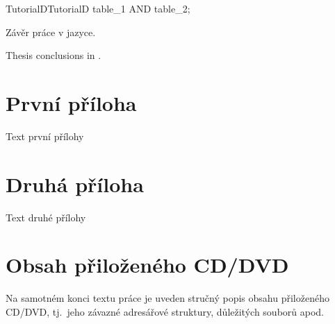\documentclass[
  field=inf,
  biblatex,
  glossaries,
  index
]{kidiplom}
\begin{document}
\begin{kicode}{TutorialD}{}{TutorialD}
table_1 AND table_2;
\end{kicode}

\begin{kiconclusions}
Závěr práce v  jazyce.
\end{kiconclusions}

\begin{kiconclusions}[english]
Thesis conclusions in .
\end{kiconclusions}

\appendix

\section{První příloha}
Text první přílohy

\section{Druhá příloha}
Text druhé přílohy

\section{Obsah přiloženého CD/DVD} \label{sec:ObsahCD}

Na samotném konci textu práce je uveden stručný popis obsahu
přiloženého CD/DVD, tj.~jeho závazné adresářové struktury, důležitých
souborů apod.
\end{document}
